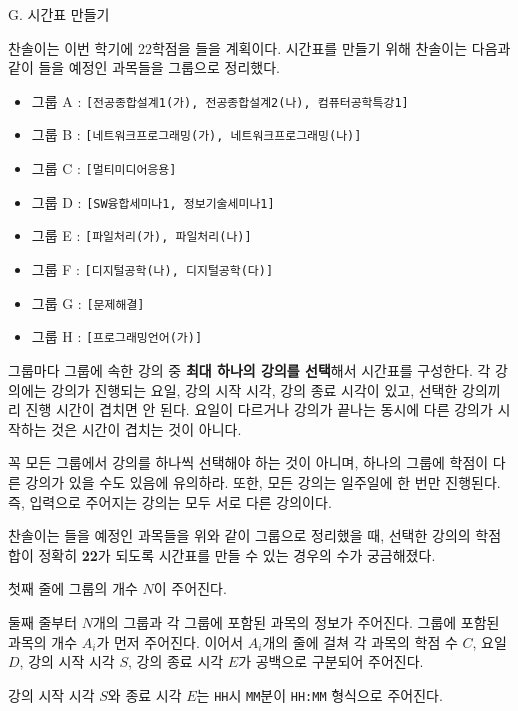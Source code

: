 \def\probtitle{시간표 만들기}
\def\probno{G} %

\begin{problem}{\probno{}. \probtitle{}}

찬솔이는 이번 학기에 22학점을 들을 계획이다. 시간표를 만들기 위해 찬솔이는 다음과 같이 들을 예정인 과목들을 그룹으로 정리했다.

\begin{itemize}[topsep=0pt,noitemsep]
    \item 그룹 A : \texttt{[전공종합설계1(가), 전공종합설계2(나), 컴퓨터공학특강1]}
    \item 그룹 B : \texttt{[네트워크프로그래밍(가), 네트워크프로그래밍(나)]}
    \item 그룹 C : \texttt{[멀티미디어응용]}
    \item 그룹 D : \texttt{[SW융합세미나1, 정보기술세미나1]}
    \item 그룹 E : \texttt{[파일처리(가), 파일처리(나)]}
    \item 그룹 F : \texttt{[디지털공학(나), 디지털공학(다)]}
    \item 그룹 G : \texttt{[문제해결]}
    \item 그룹 H : \texttt{[프로그래밍언어(가)]}
\end{itemize}

그룹마다 그룹에 속한 강의 중 \textbf{최대 하나의 강의를 선택}해서 시간표를 구성한다. 각 강의에는 강의가 진행되는 요일, 강의 시작 시각, 강의 종료 시각이 있고, 선택한 강의끼리 진행 시간이 겹치면 안 된다. 요일이 다르거나 강의가 끝나는 동시에 다른 강의가 시작하는 것은 시간이 겹치는 것이 아니다.

꼭 모든 그룹에서 강의를 하나씩 선택해야 하는 것이 아니며, 하나의 그룹에 학점이 다른 강의가 있을 수도 있음에 유의하라. 또한, 모든 강의는 일주일에 한 번만 진행된다. 즉, 입력으로 주어지는 강의는 모두 서로 다른 강의이다.

찬솔이는 들을 예정인 과목들을 위와 같이 그룹으로 정리했을 때, 선택한 강의의 학점 합이 정확히 \textbf{22}가 되도록 시간표를 만들 수 있는 경우의 수가 궁금해졌다.

\InputFile

첫째 줄에 그룹의 개수 $N$이 주어진다. 

둘째 줄부터 $N$개의 그룹과 각 그룹에 포함된 과목의 정보가 주어진다. 그룹에 포함된 과목의 개수 $A_i$가 먼저 주어진다. 이어서 $A_i$개의 줄에 걸쳐 각 과목의 학점 수 $C$, 요일 $D$, 강의 시작 시각 $S$, 강의 종료 시각 $E$가 공백으로 구분되어 주어진다.

강의 시작 시각 $S$와 종료 시각 $E$는 \texttt{HH}시 \texttt{MM}분이 \texttt{HH:MM} 형식으로 주어진다.


\end{problem}
